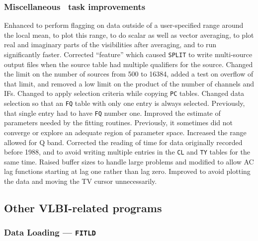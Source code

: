 \subsubsection{Miscellaneous \uv\ task improvements}

\begin{description}
 Enhanced to perform flagging on data outside of a
    user-specified range around the local mean, to plot this range, to
    do scalar as well as vector averaging, to plot real and imaginary
    parts of the visibilities after averaging, and to run
    significantly faster.
 Corrected ``feature'' which caused {\tt SPLIT} to write
    multi-source output files when the source table had multiple
    qualifiers for the source.
 Changed the limit on the number of sources from 500 to
    16384, added a test on overflow of that limit, and removed a low
    limit on the product of the number of channels and IFs.  Changed
    to apply selection criteria while copying {\tt PC} tables.
 Changed data selection so that an {\tt FQ}
    table with only one entry is always selected.  Previously, that
    single entry had to have {\tt FQ} number one.
 Improved the estimate of parameters needed by the
    fitting routines.  Previously, it sometimes did not converge or
    explore an adequate region of parameter space.
 Increased the range allowed for Q band.  Corrected the
    reading of time for data originally recorded before 1988, and to
    avoid writing multiple entries in the {\tt CL} and {\tt TY} tables
    for the same time.
 Raised buffer sizes to handle large problems and
    modified to allow AC lag functions starting at lag one rather than
    lag zero.
 Improved to avoid plotting the data and moving the TV
    cursor unnecessarily.
\end{description}

\subsection{Other VLBI-related programs}

\subsubsection{Data Loading --- {\tt FITLD}}

